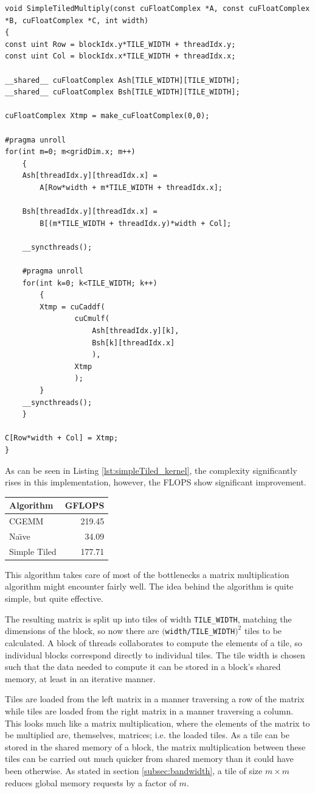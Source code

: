 \documentclass[a4paper,12pt]{report}
\def\flops{{FLOPS}}
\newenvironment{CUDAtiming}%
{\setlength{\extrarowheight}{1.5pt} \begin{center}\begin{tabular}{l|r} Algorithm & GFLOPS\\\hline}%
{\end{tabular}\end{center}}
\begin{document}
\begin{lstlisting}[float,caption=Simple Tiled Matrix Multiplication Kernel, label=lst:simpleTiled_kernel]
void SimpleTiledMultiply(const cuFloatComplex *A, const cuFloatComplex *B, cuFloatComplex *C, int width)
{
const uint Row = blockIdx.y*TILE_WIDTH + threadIdx.y;
const uint Col = blockIdx.x*TILE_WIDTH + threadIdx.x;

__shared__ cuFloatComplex Ash[TILE_WIDTH][TILE_WIDTH];
__shared__ cuFloatComplex Bsh[TILE_WIDTH][TILE_WIDTH];

cuFloatComplex Xtmp = make_cuFloatComplex(0,0);

#pragma unroll
for(int m=0; m<gridDim.x; m++)
	{
	Ash[threadIdx.y][threadIdx.x] =
		A[Row*width + m*TILE_WIDTH + threadIdx.x];
	
	Bsh[threadIdx.y][threadIdx.x] =
		B[(m*TILE_WIDTH + threadIdx.y)*width + Col];
	
	__syncthreads();

	#pragma unroll
	for(int k=0; k<TILE_WIDTH; k++)
		{
		Xtmp = cuCaddf(
				cuCmulf(
					Ash[threadIdx.y][k],
					Bsh[k][threadIdx.x]
					),
				Xtmp
				); 
		}
	__syncthreads();
	}

C[Row*width + Col] = Xtmp;
}
\end{lstlisting}

As can be seen in Listing \ref{lst:simpleTiled_kernel}, the complexity significantly rises in this implementation, however, the \flops{} show significant improvement.

\begin{CUDAtiming}
CGEMM & 219.45\\
Na{\"\i}ve & 34.09\\
Simple Tiled & 177.71
\end{CUDAtiming}


This algorithm takes care of most of the bottlenecks a matrix multiplication algorithm might encounter fairly well.
The idea behind the algorithm is quite simple, but quite effective.

The resulting matrix is split up into tiles of width \verb!TILE_WIDTH!, matching the dimensions of the block, so now there are
$($\verb!width/TILE_WIDTH!$)^2$ tiles to be calculated.
A block of threads collaborates to compute the elements of a tile, so individual blocks correspond directly to individual tiles.
The tile width is chosen such that the data needed to compute it can be stored in a block's shared memory, at least in an iterative manner.

Tiles are loaded from the left matrix in a manner traversing a row of the matrix while tiles are loaded from the right matrix in a manner traversing a column.
This looks much like a matrix multiplication, where the elements of the matrix to be multiplied are, themselves, matrices; i.e.
the loaded tiles.
As a tile can be stored in the shared memory of a block, the matrix multiplication between these tiles can be carried out much quicker from shared memory than it could have been otherwise.
As stated in section \ref{subsec:bandwidth}, a tile of size $m \times m$ reduces global memory requests by a factor of $m$.
\end{document}
